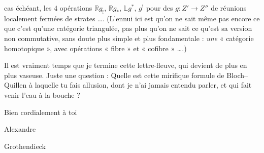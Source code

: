 \documentclass[11pt,a4paper]{article}
\begin{document}
cas échéant, les $4$ opérations $\mathbb{R}g_!$, $\mathbb{R}g_*$, $\mathbb{L}g^*$, $g^!$ pour des  $g \colon Z' \to Z''$ de réunions localement fermées de strates …. (L'ennui ici est qu'on ne sait même pas encore ce que c'est qu'une catégorie triangulée, pas plus qu'on ne sait ce qu'est sa version non commutative, sans doute plus simple et plus fondamentale : \emph{une} « catégorie homotopique », avec opérations « fibre » et « cofibre » ….)

Il est vraiment temps que je termine cette lettre-fleuve, qui devient de plus en plus vaseuse. Juste une question : Quelle est cette mirifique formule de Bloch--Quillen à laquelle tu fais allusion, dont je n'ai jamais entendu parler, et qui fait venir l'eau à la bouche ?

Bien cordialement à toi

Alexandre

Grothendieck
\end{document}
